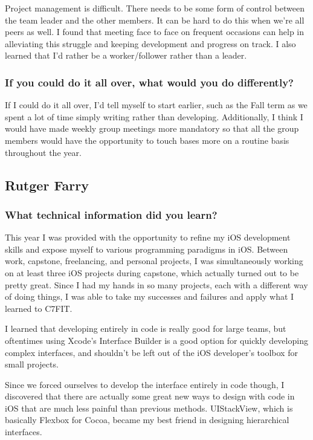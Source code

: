 Project management is difficult. There needs to be some form of control between the team leader and the other members. It can be hard to do this when we're all peers as well. I found that meeting face to face on frequent occasions can help in alleviating this struggle and keeping development and progress on track. I also learned that I'd rather be a worker/follower rather than a leader.

\subsubsection{If you could do it all over, what would you do differently?}

If I could do it all over, I'd tell myself to start earlier, such as the Fall term as we spent a lot of time simply writing rather than developing. Additionally, I think I would have made weekly group meetings more mandatory so that all the group members would have the opportunity to touch bases more on a routine basis throughout the year.

\subsection{Rutger Farry}
\subsubsection{What technical information did you learn?}
This year I was provided with the opportunity to refine my iOS development skills and expose myself to various programming paradigms in iOS. Between work, capstone, freelancing, and personal projects, I was simultaneously working on at least three iOS projects during capstone, which actually turned out to be pretty great. Since I had my hands in so many projects, each with a different way of doing things, I was able to take my successes and failures and apply what I learned to C7FIT. 

I learned that developing entirely in code is really good for large teams, but oftentimes using Xcode's Interface Builder is a good option for quickly developing complex interfaces, and shouldn't be left out of the iOS developer's toolbox for small projects.

Since we forced ourselves to develop the interface entirely in code though, I discovered that there are actually some great new ways to design with code in iOS that are much less painful than previous methods. UIStackView, which is basically Flexbox for Cocoa, became my best friend in designing hierarchical interfaces.

